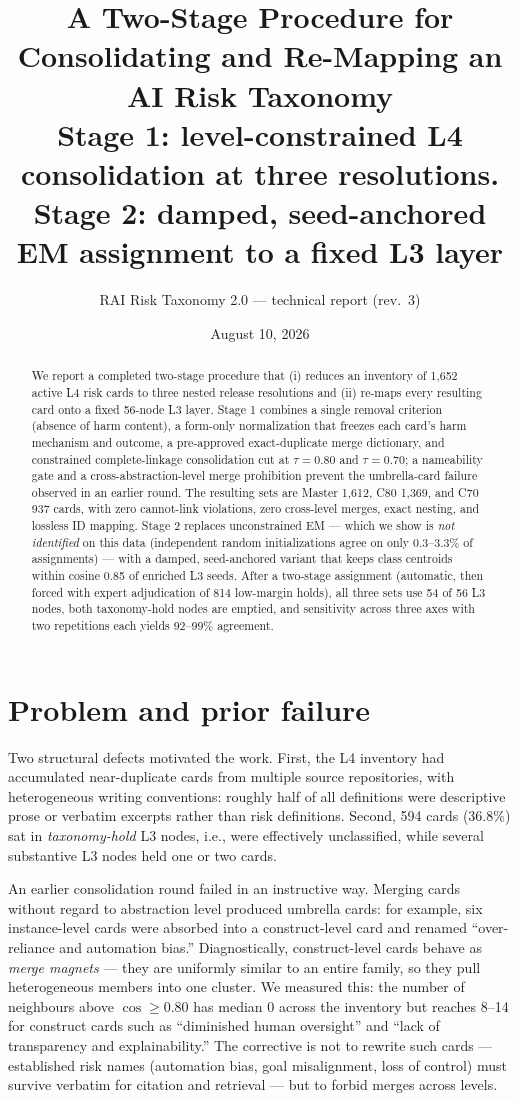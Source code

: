\documentclass[11pt,a4paper]{article}
\title{\textbf{A Two-Stage Procedure for Consolidating and Re-Mapping an AI Risk Taxonomy}\\[3pt]
\large Stage 1: level-constrained L4 consolidation at three resolutions.\\
Stage 2: damped, seed-anchored EM assignment to a fixed L3 layer}
\author{RAI Risk Taxonomy 2.0 --- technical report (rev.~3)}
\date{August 10, 2026}
\begin{document}
\maketitle

\begin{abstract}
We report a completed two-stage procedure that (i) reduces an inventory of 1{,}652 active L4 risk cards to three nested release resolutions and (ii) re-maps every resulting card onto a fixed 56-node L3 layer. Stage 1 combines a single removal criterion (absence of harm content), a form-only normalization that freezes each card's harm mechanism and outcome, a pre-approved exact-duplicate merge dictionary, and constrained complete-linkage consolidation cut at $\tau=0.80$ and $\tau=0.70$; a nameability gate and a cross-abstraction-level merge prohibition prevent the umbrella-card failure observed in an earlier round. The resulting sets are Master 1{,}612, C80 1{,}369, and C70 937 cards, with zero cannot-link violations, zero cross-level merges, exact nesting, and lossless ID mapping. Stage 2 replaces unconstrained EM --- which we show is \emph{not identified} on this data (independent random initializations agree on only 0.3--3.3\% of assignments) --- with a damped, seed-anchored variant that keeps class centroids within cosine 0.85 of enriched L3 seeds. After a two-stage assignment (automatic, then forced with expert adjudication of 814 low-margin holds), all three sets use 54 of 56 L3 nodes, both taxonomy-hold nodes are emptied, and sensitivity across three axes with two repetitions each yields 92--99\% agreement.
\end{abstract}

\section{Problem and prior failure}

Two structural defects motivated the work. First, the L4 inventory had accumulated near-duplicate cards from multiple source repositories, with heterogeneous writing conventions: roughly half of all definitions were descriptive prose or verbatim excerpts rather than risk definitions. Second, 594 cards (36.8\%) sat in \emph{taxonomy-hold} L3 nodes, i.e., were effectively unclassified, while several substantive L3 nodes held one or two cards.

An earlier consolidation round failed in an instructive way. Merging cards without regard to abstraction level produced umbrella cards: for example, six instance-level cards were absorbed into a construct-level card and renamed ``over-reliance and automation bias.'' Diagnostically, construct-level cards behave as \emph{merge magnets} --- they are uniformly similar to an entire family, so they pull heterogeneous members into one cluster. We measured this: the number of neighbours above $\cos \geq 0.80$ has median 0 across the inventory but reaches 8--14 for construct cards such as ``diminished human oversight'' and ``lack of transparency and explainability.'' The corrective is not to rewrite such cards --- established risk names (automation bias, goal misalignment, loss of control) must survive verbatim for citation and retrieval --- but to forbid merges across levels.
\end{document}
